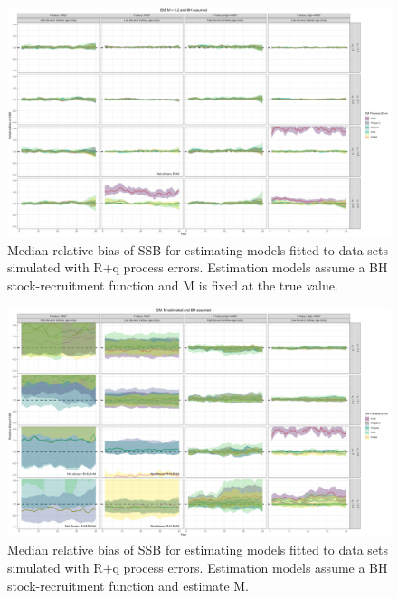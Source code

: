 \documentclass[
  12pt,
]{article}
\begin{document}
\begin{landscape}
\begin{figure}
\caption{Median relative bias of SSB for estimating models fitted to data sets simulated with R+q process errors. Estimation models assume a BH stock-recruitment function and M is fixed at the true value.}\label{q_om_em_BH_MF_relbias_ssb}
\begin{center}
\includegraphics[width = \textwidth]{q_om_BH_MF_relbias_ssb.png}
\end{center}
\end{figure}
\end{landscape}

\begin{landscape}
\begin{figure}
\caption{Median relative bias of SSB for estimating models fitted to data sets simulated with R+q process errors. Estimation models assume a BH stock-recruitment function and estimate M.}\label{q_om_em_BH_ME_relbias_ssb}
\begin{center}
\includegraphics[width = \textwidth]{q_om_BH_ME_relbias_ssb.png}
\end{center}
\end{figure}
\end{landscape}
\end{document}
